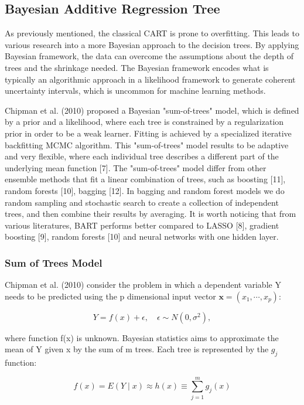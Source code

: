 \documentclass{usiinftr}
\begin{document}
\subsection{Bayesian Additive Regression Tree}
As previously mentioned, the classical CART is prone to overfitting. This leads to various research into a more Bayesian approach to the decision trees. By applying Bayesian framework, the data can overcome the assumptions about the depth of trees and the shrinkage needed. The Bayesian framework encodes what is typically an algorithmic approach in a likelihood framework to generate coherent uncertainty intervals, which is uncommon for machine learning methods. 

 Chipman et al. (2010) proposed a Bayesian "sum-of-trees" model, which is defined by a prior and a likelihood, where each tree is constrained by a regularization prior in order to be a weak learner.  Fitting is achieved by a specialized iterative backfitting MCMC algorithm. This "sum-of-trees" model results to be adaptive and very flexible, where each individual tree describes a different part of the underlying mean function [7]. The "sum-of-trees" model differ from other ensemble methods that fit a linear combination of trees, such as boosting [11], random forests [10], bagging [12]. In bagging and random forest models we do random sampling and stochastic search to create a collection of independent trees, and then combine their results by averaging. It is worth noticing that from various literatures, BART performs better compared to LASSO [8], gradient boosting [9], random forests [10] and neural networks with one hidden layer. 
 
\subsubsection{Sum of Trees Model}
Chipman et al. (2010) consider the problem in which a dependent variable Y needs to be predicted using the p dimensional input vector $\textbf{x} = (x_1,\cdots, x_p)$:

\begin{equation}
Y=f(x)+\epsilon, \quad \epsilon \sim N\left(0, \sigma^{2}\right),
\end{equation}

where function f(x) is unknown. Bayesian statistics aims to approximate the mean of Y given x by the sum of m trees. Each tree is represented by the $g_j$ function:

\begin{equation} \label{sum}
f(x)=E(Y \mid x) \approx h(x) \equiv \sum_{j=1}^{m} g_{j}(x)
\end{equation}
\end{document}
